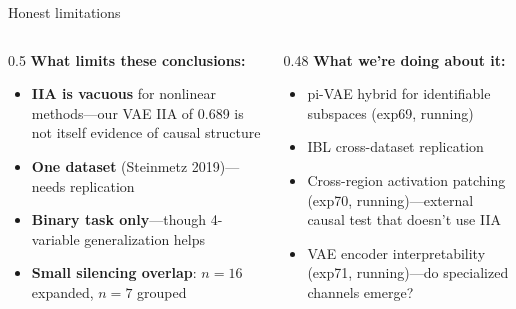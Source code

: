 \documentclass[aspectratio=169,11pt]{beamer}
\begin{document}
\begin{frame}{Honest limitations}
\begin{columns}[T]
\begin{column}{0.5\textwidth}
\textbf{What limits these conclusions:}
\begin{itemize}
  \item \textbf{IIA is vacuous} for nonlinear methods---our VAE IIA of 0.689 is not itself evidence of causal structure
  \item \textbf{One dataset} (Steinmetz 2019)---needs replication
  \item \textbf{Binary task only}---though 4-variable generalization helps
  \item \textbf{Small silencing overlap}: $n = 16$ expanded, $n = 7$ grouped
\end{itemize}
\end{column}
\begin{column}{0.48\textwidth}
\textbf{What we're doing about it:}
\begin{itemize}
  \item pi-VAE hybrid for identifiable subspaces (exp69, running)
  \item IBL cross-dataset replication
  \item Cross-region activation patching (exp70, running)---external causal test that doesn't use IIA
  \item VAE encoder interpretability (exp71, running)---do specialized channels emerge?
\end{itemize}
\end{column}
\end{columns}
\end{frame}
\end{document}

